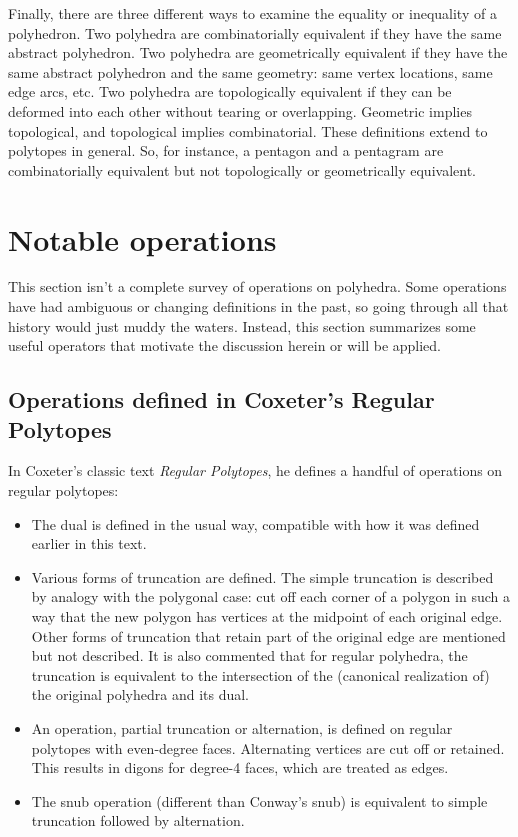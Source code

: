 \documentclass{amsart}[12pt]
\begin{document}
Finally, there are three different ways to examine the equality or inequality
of a polyhedron. Two polyhedra are combinatorially equivalent if they have the
same abstract polyhedron. Two polyhedra are geometrically equivalent if they
have the same abstract polyhedron and the same geometry: same vertex
locations, same edge arcs, etc. Two polyhedra are topologically equivalent if
they can be deformed into each other without tearing or overlapping.
Geometric implies topological, and topological implies combinatorial. These
definitions extend to polytopes in general. So, for instance, a pentagon and a
pentagram are combinatorially equivalent but not topologically or
geometrically equivalent.

\section{Notable operations}

This section isn't a complete survey of operations on polyhedra. Some
operations have had ambiguous or changing definitions in the past, so going
through all that history would just muddy the waters. Instead, this section
summarizes some useful operators that motivate the discussion herein or will
be applied.

\subsection{Operations defined in Coxeter's Regular Polytopes}

In Coxeter's classic text \textit{Regular Polytopes}\cite{coxeter73},
he defines a handful of operations on regular polytopes:
\begin{itemize}
  \item The dual is defined in the usual way, compatible with how it was
  defined earlier in this text.
  \item Various forms of truncation are defined. The simple truncation is
  described by analogy with the polygonal case: cut off each corner of a
  polygon in such a way that the new polygon has vertices at the midpoint of
  each original edge. Other forms of truncation that retain part of the original
  edge are mentioned but not described. It is also commented that for regular
  polyhedra, the truncation is equivalent to the intersection
  of the (canonical realization of) the original polyhedra and its dual.
  \item An operation, partial truncation or alternation, is defined on regular
  polytopes with even-degree faces. Alternating vertices are cut off or
  retained. This results in digons for degree-4 faces,
  which are treated as edges.
  \item The snub operation (different than Conway's snub)
  is equivalent to simple truncation followed by alternation.
\end{itemize}
\end{document}
